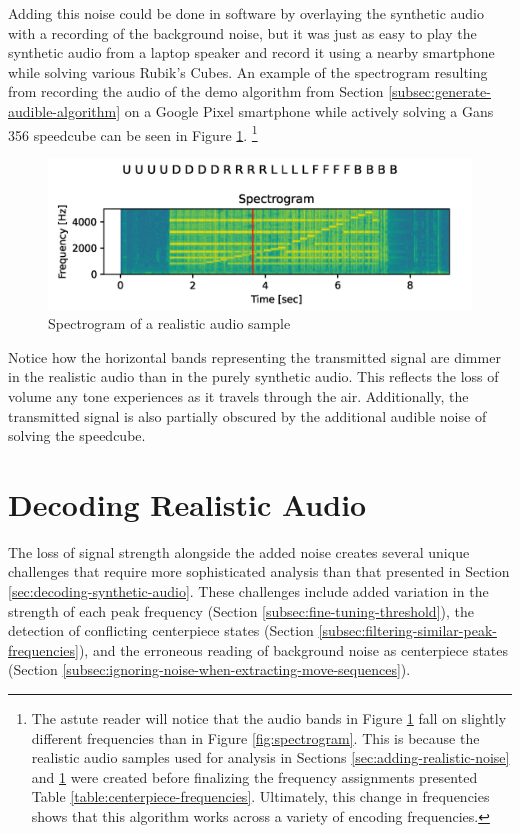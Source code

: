 Adding this noise could be done in software by overlaying the synthetic
audio with a recording of the background noise, but it was just as easy
to play the synthetic audio from a laptop speaker and record it using a
nearby smartphone while solving various Rubik's Cubes. An example of
the spectrogram resulting from recording the audio of the demo
algorithm from Section \ref{subsec:generate-audible-algorithm} on a
Google Pixel smartphone while actively solving a Gans 356 speedcube can
be seen in Figure \ref{fig:noisy-spectrogram}. \footnote{The astute
reader will notice that the audio bands in Figure
\ref{fig:noisy-spectrogram} fall on slightly different frequencies than
in Figure \ref{fig:spectrogram}. This is because the realistic audio
samples used for analysis in Sections \ref{sec:adding-realistic-noise}
and \ref{sec:decoding-realistic-noise} were created before finalizing
the frequency assignments presented Table
\ref{table:centerpiece-frequencies}. Ultimately, this change in
frequencies shows that this algorithm works across a variety of
encoding frequencies.}

\begin{figure}[h]
    \centering
    \caption{Spectrogram of a realistic audio sample}
    \label{fig:noisy-spectrogram}
    \includegraphics[width=0.8\linewidth]{Figures/5 Algorithm Design/transmitted-356-5tps.png}
\end{figure}

Notice how the horizontal bands representing the transmitted signal are
dimmer in the realistic audio than in the purely synthetic audio. This
reflects the loss of volume any tone experiences as it travels through
the air. Additionally, the transmitted signal is also partially
obscured by the additional audible noise of solving the speedcube.

\section{Decoding Realistic Audio}
\label{sec:decoding-realistic-noise}

The loss of signal strength alongside the added noise creates several
unique challenges that require more sophisticated analysis than that
presented in Section \ref{sec:decoding-synthetic-audio}. These
challenges include added variation in the strength of each peak
frequency (Section \ref{subsec:fine-tuning-threshold}), the detection
of conflicting centerpiece states (Section
\ref{subsec:filtering-similar-peak-frequencies}), and the erroneous
reading of background noise as centerpiece states (Section
\ref{subsec:ignoring-noise-when-extracting-move-sequences}).

